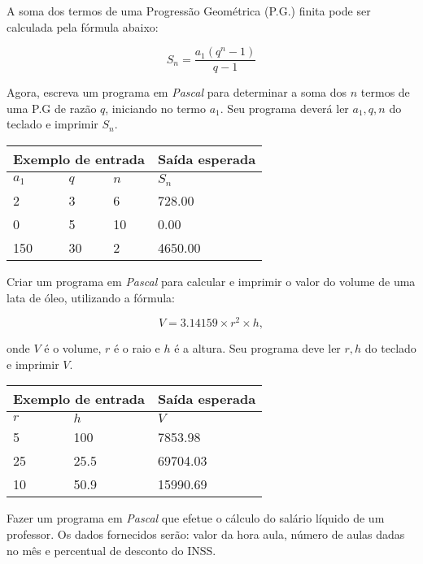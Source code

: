 \item A soma dos termos de uma Progressão Geométrica (P.G.) finita pode ser 
calculada pela fórmula abaixo:

\[
S_n = \frac{a_1 (q^n - 1)}{q - 1}
\]

Agora, escreva um programa em \emph{Pascal} para determinar a soma dos $n$ 
termos de uma P.G de razão $q$, iniciando no termo $a_1$. Seu programa
deverá ler $a_1, q, n$ do teclado e imprimir $S_n$.

\begin{center}
\begin{tabular}{|l|l|l|l|} \hline
\multicolumn{3}{|c|}{Exemplo de entrada} & Saída esperada \\ \hline
$a_1$ & $q$ & $n$   & $S_n$               \\ \hline
2 & 3 & 6         & 728.00                \\ \hline
0 & 5 & 10          & 0.00             \\ \hline
150 & 30 & 2         & 4650.00          \\ \hline
\end{tabular}
\end{center}

\item Criar um programa em \emph{Pascal} para calcular e imprimir o valor do 
volume de uma lata de óleo, utilizando a fórmula:

\[
V = 3.14159 \times r^2 \times h,
\]

onde $V$ é o volume, $r$ é o raio e $h$ é a altura. Seu programa
deve ler $r, h$ do teclado e imprimir $V$.

\begin{center}
\begin{tabular}{|l|l|l|} \hline
\multicolumn{2}{|c|}{Exemplo de entrada} & Saída esperada \\ \hline
$r$ & $h$   & $V$               \\ \hline
5 & 100          & 7853.98                \\ \hline
25 & 25.5           & 69704.03             \\ \hline
10 & 50.9         & 15990.69          \\ \hline
\end{tabular}
\end{center}

\item Fazer um programa em \emph{Pascal} que efetue o cálculo do salário 
líquido de um professor. Os dados fornecidos serão: valor da hora aula, 
número de aulas dadas no mês e percentual de desconto do INSS.

